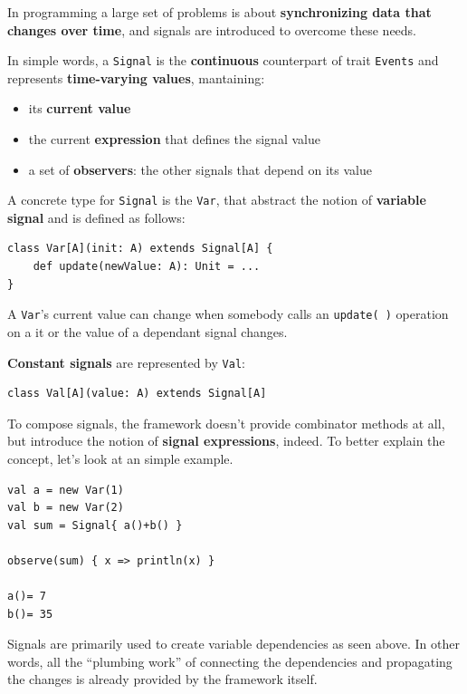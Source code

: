 In programming a large set of problems is about \textbf{synchronizing
data that changes over time}, and signals are introduced to overcome
these needs.

In simple words, a \texttt{Signal} is the \textbf{continuous}
counterpart of trait \texttt{Events} and represents \textbf{time-varying
values}, mantaining:

\begin{itemize}
\itemsep1pt\parskip0pt
\item
  its \textbf{current value}
\item
  the current \textbf{expression} that defines the signal value
\item
  a set of \textbf{observers}: the other signals that depend on its
  value
\end{itemize}

A concrete type for \texttt{Signal} is the \texttt{Var}, that abstract
the notion of \textbf{variable signal} and is defined as follows:

\begin{verbatim}
class Var[A](init: A) extends Signal[A] {
    def update(newValue: A): Unit = ...
}
\end{verbatim}

A \texttt{Var}'s current value can change when somebody calls an
\texttt{update(\ )} operation on a it or the value of a dependant signal
changes.

\textbf{Constant signals} are represented by \texttt{Val}:

\begin{verbatim}
class Val[A](value: A) extends Signal[A]
\end{verbatim}

To compose signals, the framework doesn't provide combinator methods at
all, but introduce the notion of \textbf{signal expressions}, indeed. To
better explain the concept, let's look at an simple example.

\begin{verbatim}
val a = new Var(1)
val b = new Var(2)
val sum = Signal{ a()+b() }

observe(sum) { x => println(x) }

a()= 7
b()= 35
\end{verbatim}

Signals are primarily used to create variable dependencies as seen
above. In other words, all the ``plumbing work'' of connecting the
dependencies and propagating the changes is already provided by the
framework itself.

